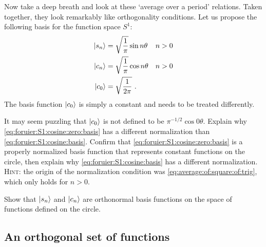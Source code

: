 Now take a deep breath and look at these `average over a period' relations. 
Taken together, they look remarkably like orthogonality conditions. Let us propose the following basis for the function space $S^1$:
\begin{align}
    \left|s_n\right\rangle &= \sqrt{\frac{1}{\pi}} \sin n\theta
    &
    n&>0
    \label{eq:foruier:S1:sine:basis}
    \\
    \left|c_n\right\rangle &= \sqrt{\frac{1}{\pi}} \cos n\theta 
    &
    n&> 0
    \label{eq:foruier:S1:cosine:basis}
    \\
    \left|c_0\right\rangle &= \sqrt{\frac{1}{2\pi}} 
    \label{eq:foruier:S1:cosine:zero:basis}
    \ .
\end{align}
The basis function $\left|c_0\right\rangle$ is simply a constant and needs to be treated differently.
\begin{exercise}
It may seem puzzling that $\left|c_0\right\rangle$ is not defined to be $\pi^{-1/2}\cos 0\theta$. Explain why \eqref{eq:foruier:S1:cosine:zero:basis} has a different normalization than \eqref{eq:foruier:S1:cosine:basis}. Confirm that \eqref{eq:foruier:S1:cosine:zero:basis} is a properly normalized basis function that represents constant functions on the circle, then explain why \eqref{eq:foruier:S1:cosine:basis} has a different normalization.  \textsc{Hint}: the origin of the normalization condition was \eqref{eq:average:of:square:of:trig}, which only holds for $n>0$.
\end{exercise}
\begin{exercise}
Show that $\left|s_n\right\rangle$ and $\left|c_n\right\rangle$ are orthonormal basis functions on the space of functions defined on the circle.
\end{exercise}



\subsection{An orthogonal set of functions}

